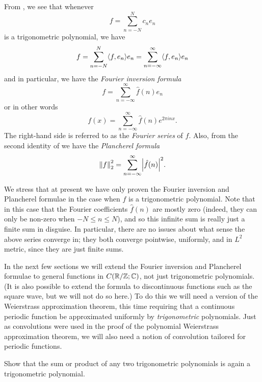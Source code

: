 \begin{ac}\label{ii:ac:5.3.1}
  From , we see that whenever
  \[
    f = \sum_{n = -N}^N c_n e_n
  \]
  is a trigonometric polynomial, we have
  \[
    f = \sum_{n = -N}^N \inner*{f, e_n} e_n = \sum_{n = -\infty}^\infty \inner*{f, e_n} e_n
  \]
  and in particular, we have the \emph{Fourier inversion formula}
  \[
    f = \sum_{n = -\infty}^\infty \hat{f}(n) e_n
  \]
  or in other words
  \[
    f(x) = \sum_{n = -\infty}^\infty \hat{f}(n) e^{2 \pi i n x}.
  \]
  The right-hand side is referred to as the \emph{Fourier series} of \(f\).
  Also, from the second identity of  we have the \emph{Plancherel formula}
  \[
    \norm*{f}_2^2 = \sum_{n = -\infty}^\infty \abs{\hat{f}(n)}^2.
  \]
\end{ac}

\begin{rmk}\label{ii:5.3.8}
  We stress that at present we have only proven the Fourier inversion and Plancherel formulae in the case when \(f\) is a trigonometric polynomial.
  Note that in this case that the Fourier coefficients \(\hat{f}(n)\) are mostly zero (indeed, they can only be non-zero when \(-N \leq n \leq N\)), and so this infinite sum is really just a finite sum in disguise.
  In particular, there are no issues about what sense the above series converge in;
  they both converge pointwise, uniformly, and in \(L^2\) metric, since they are just finite sums.
\end{rmk}

\begin{note}
  In the next few sections we will extend the Fourier inversion and Plancherel formulae to general functions in \(C(\mathbb{R} / \mathbb{Z} ; \mathbb{C})\), not just trigonometric polynomials.
  (It is also possible to extend the formula to discontinuous functions such as the square wave, but we will not do so here.)
  To do this we will need a version of the Weierstrass approximation theorem, this time requiring that a continuous periodic function be approximated uniformly by \emph{trigonometric} polynomials.
  Just as convolutions were used in the proof of the polynomial Weierstrass approximation theorem, we will also need a notion of convolution tailored for periodic functions.
\end{note}

\exercisesection

\begin{ex}\label{ii:ex:5.3.1}
  Show that the sum or product of any two trigonometric polynomials is again a trigonometric polynomial.
\end{ex}

